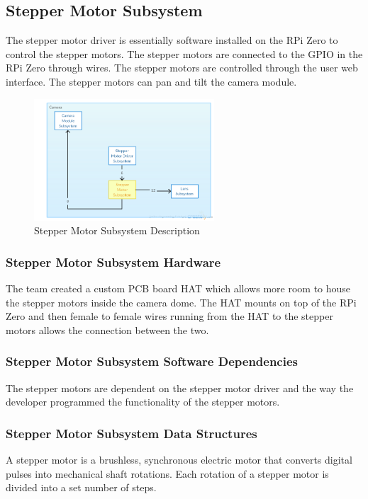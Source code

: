 \subsection{Stepper Motor Subsystem}
The stepper motor driver is essentially software installed on the RPi Zero to control the stepper motors. The stepper motors are connected to the GPIO in the RPi Zero through wires. The stepper motors are controlled through the user web interface. The stepper motors can pan and tilt the camera module. 

\begin{figure}[h!] 
 	\centering 
  	\includegraphics[width=0.60\textwidth]{architectural design specification latex/images/ADSdiagrams/steppermotorsubsystem.png} 
 \caption{Stepper Motor Subsystem Description} 
\end{figure}

\subsubsection{Stepper Motor Subsystem Hardware}
The team created a custom PCB board HAT which allows more room to house the stepper motors inside the camera dome. The HAT mounts on top of the RPi Zero and then female to female wires running from the HAT to the stepper motors allows the connection between the two.


\subsubsection{Stepper Motor Subsystem Software Dependencies}
The stepper motors are dependent on the stepper motor driver and the way the developer programmed the functionality of the stepper motors.


\subsubsection{Stepper Motor Subsystem Data Structures}
A stepper motor is a brushless, synchronous electric motor that converts digital pulses into mechanical shaft rotations. Each rotation of a stepper motor is divided into a set number of steps.



